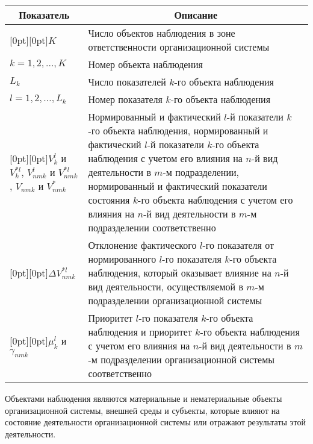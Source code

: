 \begin{multicols}{2}
          \begin{table*}\small
     \begin{center}
     \vspace*{2ex}

     \begin{tabular}{|l|p{100mm}|}
     \hline
\multicolumn{1}{|c|}{Показатель}&\multicolumn{1}{c|}{Описание}\\
\hline
\multicolumn{1}{|l|}{\raisebox{-6pt}[0pt][0pt]{$K$}} &Число объектов наблюдения в зоне ответственности организационной системы\\
\hline
$k = 1, 2, \ldots , K$&Номер объекта наблюдения\\
\hline
$L_k$ &Число показателей $k$-го объекта наблюдения\\
\hline
$l = 1, 2, \ldots , L_k$&Номер показателя $k$-го объекта наблюдения\\
\hline
\multicolumn{1}{|l|}{\raisebox{-24pt}[0pt][0pt]{$V_k^l$ и
$V^{*l}_k$, $V^l_{nmk}$ и $V^{*l}_{nmk}$, $V_{nmk}$ и $V^*_{nmk}$}}&
Нормированный и
фактический $l$-й показатели $k$-го объекта наблюдения, нормированный и фактический
$l$-й показатели $k$-го объекта наблюдения с учетом его влияния на $n$-й вид деятельности в $m$-м
подразделении, нормированный и фактический показатели состояния \mbox{$k$-го} объекта наблюдения с
учетом его влияния на $n$-й вид де\-ятельности в $m$-м подразделении соответственно\\
\hline
\multicolumn{1}{|l|}{\raisebox{-16pt}[0pt][0pt]{$\Delta V^{*l}_{nmk}$}}&Отклонение фактического $l$-го показателя от нормированного $l$-го показателя
$k$-го объекта наблюдения, который оказывает влияние на $n$-й вид деятельности, осуществляемой в
$m$-м подразделении организационной системы\\
\hline
\multicolumn{1}{|l|}{\raisebox{-11pt}[0pt][0pt]{$\mu^l_k$ и $\gamma_{nmk}$}} &Приоритет $l$-го показателя $k$-го объекта наблюдения и
приоритет $k$-го объекта наблюдения с учетом его влияния на $n$-й вид деятельности в $m$-м
подразделении организационной сис\-те\-мы соответственно\\
\hline
\end{tabular}
\end{center}
\end{table*}

     Объектами наблюдения являются материальные и нематериальные объекты
организационной сис\-те\-мы, внешней среды и субъекты, которые влияют на
состояние деятельности организационной сис\-те\-мы или отражают результаты этой
деятельности.


\end{multicols}
